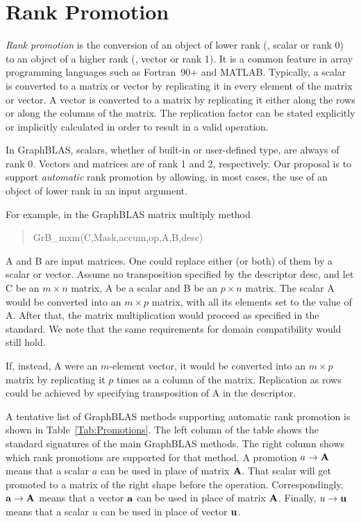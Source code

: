 \section{Rank Promotion}
\label{Sec:promotion}

\renewcommand{\vector}[1]{{\bf #1}}
\renewcommand{\matrix}[1]{{\bf #1}}

\emph{Rank promotion} is the conversion of an object of lower rank (\eg,
scalar or rank 0) to an object of a higher rank (\eg, vector or rank 1).
It is a common feature in array programming languages such as Fortran~90+
and MATLAB.  Typically, a scalar is converted to a matrix or vector
by replicating it in every element of the matrix or vector. A vector is
converted to a matrix by replicating it either along the rows or along the
columns of the matrix.  The replication factor can be stated explicitly
or implicitly calculated in order to result in a valid operation.

In GraphBLAS, scalars, whether of built-in or user-defined type, are
always of rank 0. Vectors and matrices are of rank 1 and 2, respectively.
Our proposal is to support \emph{automatic} rank promotion by allowing,
in most cases, the use of an object of lower rank in an input argument.

For example, in the GraphBLAS matrix multiply method 
\begin{quote} 
{\sf GrB\_mxm(C,Mask,accum,op,A,B,desc)}
\end{quote}
{\sf A} and {\sf B} are input matrices. One could replace either (or both)
of them by a scalar or vector.  Assume no transposition specified by the
descriptor {\sf desc}, and let {\sf C} be an $m \times n$ matrix, {\sf A}
be a scalar and {\sf B} be an $p \times n$ matrix. The scalar {\sf A}
would be converted into an $m \times p$ matrix, with all its elements
set to the value of {\sf A}.  After that, the matrix multiplication would
proceed as specified in the standard.  We note that the same requirements
for domain compatibility would still hold.

If, instead, {\sf A} were an $m$-element vector, it would be converted
into an $m \times p$ matrix by replicating it $p$ times as a column
of the matrix.  Replication as rows could be achieved by specifying
transposition of {\sf A} in the descriptor.

A tentative list of GraphBLAS methods supporting automatic rank promotion
is shown in Table~\ref{Tab:Promotions}.  The left column of the table
shows the standard signatures of the main GraphBLAS methods. The right
column shows which rank promotions are supported for that method. A
promotion $a \rightarrow \matrix{A}$ means that a scalar $a$ can be
used in place of matrix $\matrix{A}$. That scalar will get promoted to a matrix
of the right shape before the operation.  Correspondingly, $\vector{a}
\rightarrow \matrix{A}$ means that a vector $\vector{a}$ can be used in
place of matrix $\matrix{A}$. Finally, $u \rightarrow \vector{u}$ means that a
scalar $u$ can be used in place of vector $\vector{u}$.

